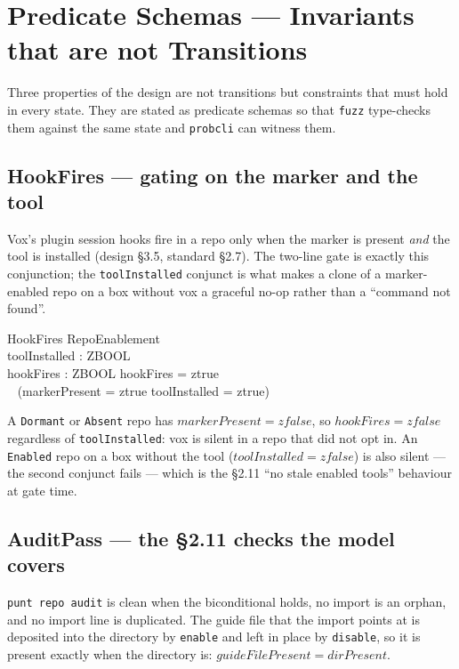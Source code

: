 \documentclass[a4paper,10pt,fleqn]{article}
\begin{document}
\section{Predicate Schemas --- Invariants that are not Transitions}
\label{sec:predicates}

Three properties of the design are not transitions but constraints that must
hold in every state. They are stated as predicate schemas so that
\texttt{fuzz} type-checks them against the same state and \texttt{probcli} can
witness them.

\subsection{HookFires --- gating on the marker and the tool}

Vox's plugin session hooks fire in a repo only when the marker is present
\emph{and} the tool is installed (design \S3.5, standard \S2.7). The two-line
gate is exactly this conjunction; the \texttt{toolInstalled} conjunct is what
makes a clone of a marker-enabled repo on a box without vox a graceful no-op
rather than a ``command not found''.

\begin{schema}{HookFires}
  RepoEnablement \\
  toolInstalled : ZBOOL \\
  hookFires : ZBOOL
  \where
  hookFires = ztrue \iff \\
  \quad~ (markerPresent = ztrue \land toolInstalled = ztrue)
\end{schema}

A \texttt{Dormant} or \texttt{Absent} repo has $markerPresent = zfalse$, so
$hookFires = zfalse$ regardless of \texttt{toolInstalled}: vox is silent in a
repo that did not opt in. An \texttt{Enabled} repo on a box without the tool
($toolInstalled = zfalse$) is also silent --- the second conjunct fails --- which
is the \S2.11 ``no stale enabled tools'' behaviour at gate time.

\subsection{AuditPass --- the \S2.11 checks the model covers}

\texttt{punt repo audit} is clean when the biconditional holds, no import is an
orphan, and no import line is duplicated. The guide file that the import points
at is deposited into the directory by \texttt{enable} and left in place by
\texttt{disable}, so it is present exactly when the directory is:
$guideFilePresent = dirPresent$.
\end{document}
